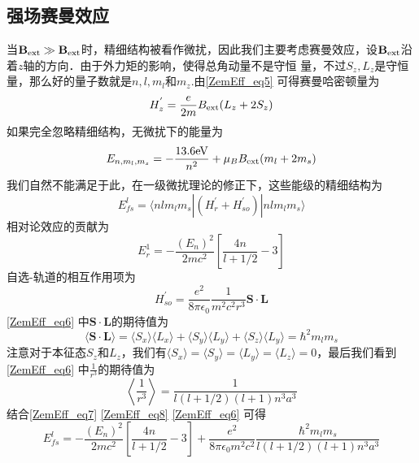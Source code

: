 \subsection{强场赛曼效应}
当$\mathbf{B}_{\rm{ext}}\gg \mathbf{B}_{\rm{ext}}$时，精细结构被看作微扰，因此我们主要考虑赛曼效应，设$\mathbf{B}_{\rm{ext}}$沿着$z$轴的方向．由于外力矩的影响，使得总角动量不是守恒
量，不过$S_z,L_z$是守恒量，那么好的量子数就是$n,l,m_l$和$m_z$.由\autoref{ZemEff_eq5} 可得赛曼哈密顿量为
\begin{equation}\label{ZemEff_eq12}
H_z^{'} = \frac{e}{2m}B_{\rm{ext}}(L_z+2S_z)
\end{equation}
如果完全忽略精细结构，无微扰下的能量为
\begin{equation}\label{ZemEff_eq7}
E_{n,m_l,m_s}=-\frac{13.6\rm{eV}}{n^2}+\mu_B B_{\rm{ext}}(m_l+2m_s)
\end{equation}
我们自然不能满足于此，在一级微扰理论的修正下，这些能级的精细结构为
\begin{equation}\label{ZemEff_eq8}
E_{fs}^l=\langle nlm_lm_s|(H^{'}_r+H^{'}_{so})|nlm_lm_s\rangle
\end{equation}
相对论效应的贡献为
\begin{equation}\label{ZemEff_eq6}
E_r^1=-\frac{(E_n)^2}{2mc^2}\left[\frac{4n}{l+1/2}-3\right]
\end{equation}
自选-轨道的相互作用项为
\begin{equation}
H^{'}_{so}=\frac{e^2}{8\pi\epsilon_0}\frac{1}{m^2c^2r^3}\mathbf{S\cdot L}
\end{equation}
\autoref{ZemEff_eq6} 中$\mathbf{S\cdot L}$的期待值为
\begin{equation}
\langle \mathbf{S\cdot L} \rangle=\langle S_x\rangle\langle L_x\rangle+\langle S_y\rangle\langle L_y\rangle+\langle S_z\rangle\langle L_y\rangle=\hbar^2
m_lm_s\end{equation}
注意对于本征态$S_z$和$L_z$，我们有$\langle S_x\rangle=\langle S_y\rangle=\langle L_y\rangle=\langle L_z\rangle=0$，最后我们看到\autoref{ZemEff_eq6} 中$\frac{1}{r^3}$的期待值为
\begin{equation}\label{ZemEff_eq11}
\left\langle\frac{1}{r^3}\right\rangle=\frac{1}{l(l+1/2)(l+1)n^3a^3}
\end{equation}
结合\autoref{ZemEff_eq7} \autoref{ZemEff_eq8} \autoref{ZemEff_eq6} 可得
\begin{equation}\label{ZemEff_eq9}
E_{fs}^l= -\frac{(E_n)^2}{2mc^2}\left[\frac{4n}{l+1/2}-3\right]+\frac{e^2}{8\pi\epsilon_0m^2c^2}\frac{\hbar^2
m_lm_s}{l(l+1/2)(l+1)n^3a^3}
\end{equation}
